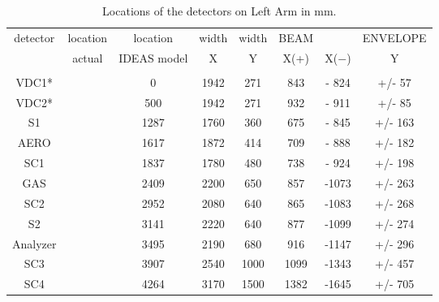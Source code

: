 \begin{table}[hptb]
\begin{center}
\begin{tabular}{cccccccc}
detector&location&  location& width &   width &      BEAM  &        & ENVELOPE \\
        & actual &IDEAS model&   X  &     Y   &      X(+)&  X($-$) &   Y\\  \hline
       &        &          &        &         &          &         &           \\  \hline    
VDC1*  &        &         0&    1942&     271 &     843  &  - 824  &  +/-  57  \\    
VDC2*  &        &       500&    1942&     271 &     932  &  - 911  &  +/-  85  \\ 
S1     &        &      1287&    1760&     360 &     675  &  - 845  &  +/- 163  \\    
AERO   &        &      1617&    1872&     414 &     709  &  - 888  &  +/- 182  \\   
SC1    &        &      1837&    1780&     480 &     738  &  - 924  &  +/- 198  \\    
GAS    &        &      2409&    2200&     650 &     857  &  -1073  &  +/- 263  \\    
SC2    &        &      2952&    2080&     640 &     865  &  -1083  &  +/- 268  \\   
S2     &        &      3141&    2220&     640 &     877  &  -1099  &  +/- 274  \\   
Analyzer&       &      3495&    2190&     680 &     916  &  -1147  &  +/- 296  \\   
SC3    &        &      3907&    2540&    1000 &    1099  &  -1343  &  +/- 457  \\  
SC4    &        &      4264&    3170&    1500 &    1382  &  -1645  &  +/- 705  \\    
\end{tabular}
\end{center}
\caption[Detectors: Left Arm Detector Locations]{Locations of
 the detectors on Left Arm in mm.}
\label{ta:Hdetg}
\end{table}



%
%
%
%
